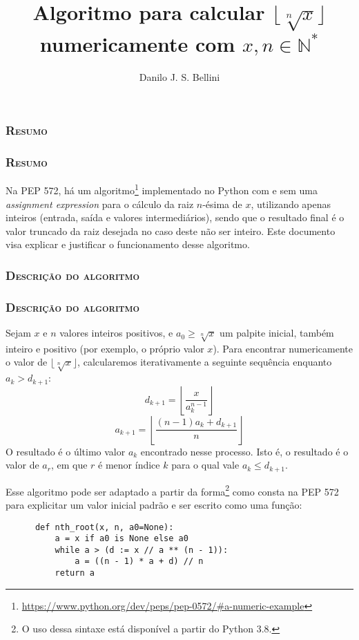 \documentclass{article}
\title{Algoritmo para calcular $\lfloor \sqrt[n]{x} \rfloor$
       numericamente com $x, n \in \mathds{N}^*$}
\author{Danilo J. S. Bellini}
\let \sectionBkp = \section
\newcommand{\sectionFormatter}[1]{
    \centering\large\textbf{\textsc{#1}}}
\renewcommand{\section}[2]
    {\ifthenelse{\equal{#1}{*}}
        {\sectionBkp*{\sectionFormatter{#2}}}
        {\sectionBkp{\sectionFormatter{#2}}}
    }
\let \partBkp = \part
\newcommand{\partFormatter}[1]{
    \centering\Large\textbf{\textsc{#1}}}
\renewcommand{\part}[2]
    {\ifthenelse{\equal{#1}{*}}
        {\partBkp*{\partFormatter{#2}}}
        {\partBkp{\partFormatter{#2}}}
    }
\begin{document}
\makeatletter\part*{\@title}\hfill\@author\makeatother


\section*{Resumo}

Na PEP 572, há um algoritmo\footnote{
  \url{https://www.python.org/dev/peps/pep-0572/\#a-numeric-example}
} implementado no Python com e sem uma \emph{assignment expression}
para o cálculo da raiz $n$-ésima de $x$,
utilizando apenas inteiros (entrada, saída e valores intermediários),
sendo que o resultado final é o valor truncado da raiz desejada
no caso deste não ser inteiro.
Este documento visa explicar e justificar
o funcionamento desse algoritmo.


\section*{Descrição do algoritmo}

Sejam $x$ e $n$ valores inteiros positivos,
e $a_0 \ge \sqrt[n]{x}$ um palpite inicial, também inteiro e positivo
(por exemplo, o próprio valor $x$).
Para encontrar numericamente o valor de $\lfloor \sqrt[n]{x} \rfloor$,
calcularemos iterativamente a seguinte sequência
enquanto $a_k > d_{k+1}$:
\[d_{k+1} = \left\lfloor \dfrac{x}{a_k^{n-1}} \right\rfloor\]
\[a_{k+1} = \left\lfloor \dfrac{(n-1) a_k + d_{k+1}}{n} \right\rfloor\]
O resultado é o último valor $a_k$ encontrado nesse processo.
Isto é, o resultado é o valor de $a_r$,
em que $r$ é menor índice $k$ para o qual vale $a_k \le d_{k+1}$.

Esse algoritmo pode ser adaptado
a partir da forma\footnote{
  O uso dessa sintaxe está disponível a partir do Python 3.8.
} como consta na PEP 572
para explicitar um valor inicial padrão e ser escrito como uma função:

\begin{center}
  \begin{minipage}{7cm}
    \begin{verbatim}
      def nth_root(x, n, a0=None):
          a = x if a0 is None else a0
          while a > (d := x // a ** (n - 1)):
              a = ((n - 1) * a + d) // n
          return a
    \end{verbatim}
  \end{minipage}
\end{center}
\end{document}
